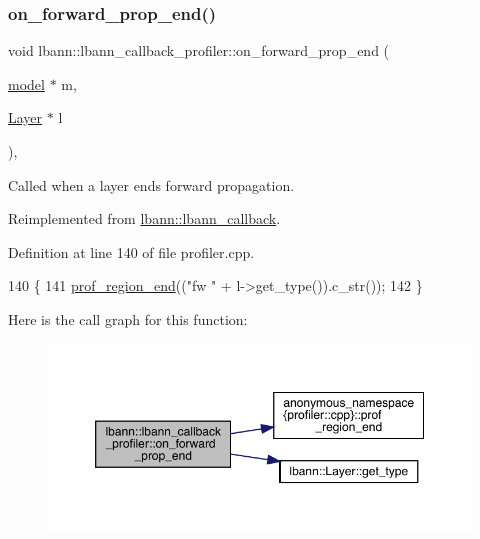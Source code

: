 \subsubsection{\texorpdfstring{on\+\_\+forward\+\_\+prop\+\_\+end()}{on\_forward\_prop\_end()}\hspace{0.1cm}{\footnotesize\ttfamily [2/2]}}
{\footnotesize\ttfamily void lbann\+::lbann\+\_\+callback\+\_\+profiler\+::on\+\_\+forward\+\_\+prop\+\_\+end (\begin{DoxyParamCaption}\item[{\hyperlink{classlbann_1_1model}{model} $\ast$}]{m,  }\item[{\hyperlink{classlbann_1_1Layer}{Layer} $\ast$}]{l }\end{DoxyParamCaption})\hspace{0.3cm}{\ttfamily [override]}, {\ttfamily [virtual]}}

Called when a layer ends forward propagation. 

Reimplemented from \hyperlink{classlbann_1_1lbann__callback_a5eff0a59fbce98a981d9cdd0547a3ad5}{lbann\+::lbann\+\_\+callback}.



Definition at line 140 of file profiler.\+cpp.


\begin{DoxyCode}
140                                                                     \{
141   \hyperlink{namespaceanonymous__namespace_02profiler_8cpp_03_a7984c26fb186307873a2f83f91715a99}{prof\_region\_end}((\textcolor{stringliteral}{"fw "} + l->get\_type()).c\_str());    
142 \}
\end{DoxyCode}
Here is the call graph for this function\+:\nopagebreak
\begin{figure}[H]
\begin{center}
\leavevmode
\includegraphics[width=350pt]{classlbann_1_1lbann__callback__profiler_a6cfc4cf84fe4229f627d18ad19eaa415_cgraph}
\end{center}
\end{figure}
\mbox{\label{classlbann_1_1lbann__callback__profiler_ad9c93def349b324a9f3a20c73a5f29a0}} 
